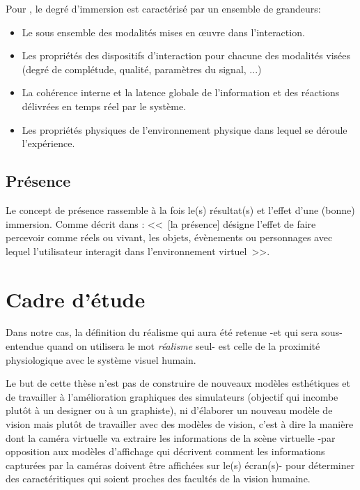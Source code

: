 	\par Pour \cite{burkhardt_conception_1999}, le degré d'immersion est caractérisé par un ensemble de grandeurs:
	\begin{itemize}
		\item Le sous ensemble des modalités mises en œuvre dans l'interaction.
		\item Les propriétés des dispositifs d'interaction pour chacune des modalités visées (degré de complétude, qualité, paramètres du signal, ...)
		\item La cohérence interne et la latence globale de l'information et des réactions délivrées en temps réel par le système.
		\item Les propriétés physiques de l'environnement physique dans lequel se déroule l'expérience.
	\end{itemize}
	
	\subsection{Présence}
	\par Le concept de présence rassemble à la fois le(s) résultat(s) et l'effet d'une (bonne) immersion. Comme décrit dans \citep{burkhardt_realite_2003}: <<~[la présence] désigne l'effet de faire percevoir comme réels ou vivant, les objets, évènements ou personnages avec lequel l'utilisateur interagit dans l'environnement virtuel~>>.
	
	\section{Cadre d'étude}
	\par Dans notre cas, la définition du réalisme qui aura été retenue -et qui sera sous-entendue quand on utilisera le mot \textit{réalisme} seul- est celle de la proximité physiologique avec le système visuel humain.
	
	\par Le but de cette thèse n'est pas de construire de nouveaux modèles esthétiques et de travailler à l'amélioration graphiques des simulateurs (objectif qui incombe plutôt à un designer ou à un graphiste), ni d'élaborer un nouveau modèle de vision mais plutôt de travailler avec des modèles de vision, c'est à dire la manière dont la caméra virtuelle va extraire les informations de la scène virtuelle -par opposition aux modèles d'affichage qui décrivent comment les informations capturées par la caméras doivent être affichées sur le(s) écran(s)- pour déterminer des caractéritiques qui soient proches des facultés de la vision humaine.
	
